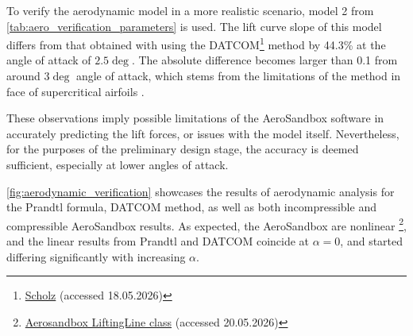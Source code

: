 To 
verify the aerodynamic model in a more realistic scenario, model 2 from \autoref{tab:aero_verification_parameters} is used. The lift curve slope of this model differs from that obtained with  %
using the DATCOM\footnote{\href{https://www.fzt.haw-hamburg.de/pers/Scholz/HOOU/AircraftDesign_7_WingDesign.pdf}{Scholz} (accessed 18.05.2026)} method by 44.3\% at the angle of attack of $2.5\deg$. The absolute difference becomes larger than 0.1 from around $3\deg$ angle of attack, which stems from the limitations of the method in face of supercritical airfoils \cite{Olson2015}.

These observations imply possible limitations of the AeroSandbox software in accurately predicting the lift forces, or issues with the model itself. Nevertheless, for the purposes of the preliminary design stage, the accuracy is deemed sufficient, especially at lower angles of attack.

\autoref{fig:aerodynamic_verification} showcases the results of aerodynamic analysis for the Prandtl formula, DATCOM method, as well as both incompressible and compressible AeroSandbox results. As expected, the AeroSandbox are nonlinear  \footnote{\href{https://aerosandbox.readthedocs.io/en/master/autoapi/aerosandbox/aerodynamics/aero_3D/lifting_line/index.html}{Aerosandbox LiftingLine class} (accessed 20.05.2026)}, and the linear results from Prandtl and DATCOM coincide at $\alpha=0$, and started differing significantly with increasing $\alpha$.


